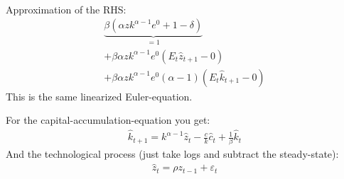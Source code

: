 \documentclass{article}
\begin{document}
\begin{enumerate}[(a)]
\begin{enumerate}[(1)]
\begin{align*}
    \end{align*}
    Approximation of the RHS:
    \begin{align*}
      \underbrace{\beta \left(\alpha z k^{\alpha-1}e^{0} +1 -\delta\right)}_{=1}\\
      +  \beta \alpha z k^{\alpha-1}e^{0}(E_t \widehat{z}_{t+1}-0)\\
      +  \beta \alpha z k^{\alpha-1}e^{0}(\alpha-1)(E_t \widehat{k}_{t+1}-0)
    \end{align*}
    This is the same linearized Euler-equation.
    \end{enumerate}
    For the capital-accumulation-equation you get:
    \begin{align*}
      \widehat{k}_{t+1} = k^{\alpha-1} \widehat{z}_t - \frac{c}{k}\widehat{c}_t + \frac{1}{\beta} \widehat{k}_t
    \end{align*}
    And the technological process (just take logs and subtract the steady-state):
    \begin{align*}
      \widehat{z}_t = \rho z_{t-1} + \varepsilon_t
    \end{align*}


\end{enumerate}
\end{document}

